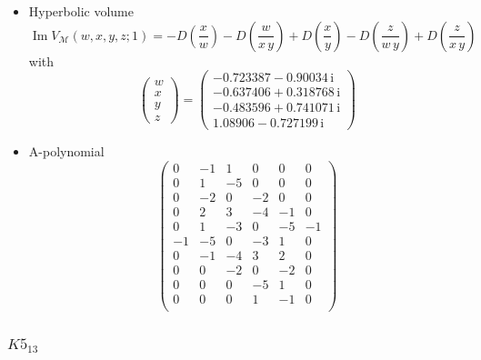 \documentclass[12pt,reqno]{amsart}
\numberwithin{equation}{section}
\renewcommand{\Im}{\operatorname{Im}}
\newcommand{\I}{\mathrm{i}}
\begin{document}
\begin{itemize}
\item Hyperbolic volume
  \begin{equation*}
    \Im V_{\mathcal{M}}(w,x,y,z; 1)
    =
    - D\left(\frac{x}{ w}\right)
    - D\left(\frac{ w}{x \, y}\right)
    + D\left(\frac{x}{y}\right)
    - D\left(\frac{z}{w \, y}\right)
    + D\left(\frac{z}{x \, y}\right) 
  \end{equation*}
  with
  \begin{equation*}
    \begin{pmatrix}
      w \\ x\\ y \\ z
    \end{pmatrix}
    =
    \begin{pmatrix}
      -0.723387 - 0.90034 \, \I
      \\
       -0.637406 + 0.318768 \,\I
       \\
       -0.483596 + 0.741071\, \I
       \\
        1.08906 - 0.727199  \, \I
    \end{pmatrix}
  \end{equation*}


\item A-polynomial
  \begin{equation*}
    \begin{pmatrix}
      0 & -1 & 1 & 0 & 0 & 0 \\
      0 & 1 & -5 & 0 & 0 & 0 \\
      0 & -2 & 0 & -2 & 0 & 0 \\
      0 & 2 & 3 & -4 & -1 & 0 \\
      0 & 1 & -3 & 0 & -5 & -1 \\
      -1 & -5 & 0 & -3 & 1 & 0 \\
      0 & -1 & -4 & 3 & 2 & 0 \\
      0 & 0 & -2 & 0 & -2 & 0 \\
      0 & 0 & 0 & -5 & 1 & 0 \\
      0 & 0 & 0 & 1 & -1 & 0 \\
    \end{pmatrix}
  \end{equation*}
\end{itemize}






\subsubsection{%
  $K5_{13}$ 
}
\end{document}
